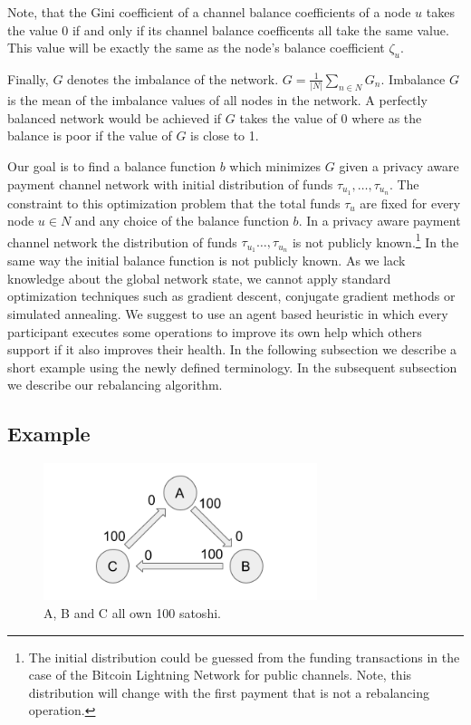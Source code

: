 \documentclass[a4paper]{paper}
\begin{document}
Note, that the Gini coefficient of a channel balance coefficients of a node $u$ takes the value $0$ if and only if its channel balance coefficents all take the same value.
This value will be exactly the same as the node's balance coefficient $\zeta_u$.

Finally, $G$ denotes the imbalance of the network. $G = \displaystyle{\frac{1}{|N|}\sum_{n\in N}G_n}$. Imbalance $G$ is the mean of the imbalance values of all nodes in the network.
A perfectly balanced network would be achieved if $G$ takes the value of $0$ where as the balance is poor if the value of $G$ is close to 1.

Our goal is to find a balance function $b$ which minimizes $G$ given a privacy aware payment channel network with initial distribution of funds $\tau_{u_1},\dots,\tau_{u_n}$.
The constraint to this optimization problem that the total funds $\tau_u$ are fixed for every node $u \in N$ and any choice of the balance function $b$.
In a privacy aware payment channel network the distribution of funds $\tau_{u_1}\dots,\tau_{u_n}$ is not publicly known.\footnote{The initial distribution could be guessed from the funding transactions in the case of the Bitcoin Lightning Network for public channels. Note, this distribution will change with the first payment that is not a rebalancing operation.}
In the same way the initial balance function is not publicly known.
As we lack knowledge about the global network state, we cannot apply standard optimization techniques such as gradient descent, conjugate gradient methods or simulated annealing.
We suggest to use an agent based heuristic in which every participant executes some operations to improve its own help which others support if it also improves their health.
In the following subsection we describe a short example using the newly defined terminology. In the subsequent subsection we describe our rebalancing algorithm.


\subsection{Example}
\label{sec:example}

\begin{figure}
 \centering
 \includegraphics[width=8cm]{img/evenUnbalanced.png}
 \caption{A, B and C all own 100 satoshi.}
 \label{fig:evenUnbalanced}
\end{figure}
\end{document}
